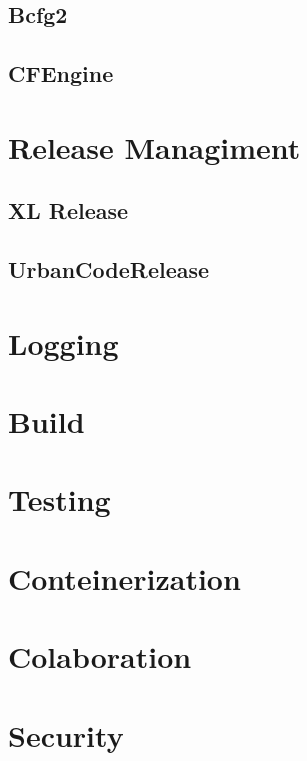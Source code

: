 	\subsection{Bcfg2}
	\subsection{CFEngine}
	
    \section{Release Managiment}

	\subsection{XL Release}
	\subsection{UrbanCodeRelease}

    \section{Logging}
    \section{Build}
    \section{Testing}
    \section{Conteinerization}
    \section{Colaboration}
    \section{Security}
    
	
	
	
	
	
	
	
	
	
	
	
	
	
